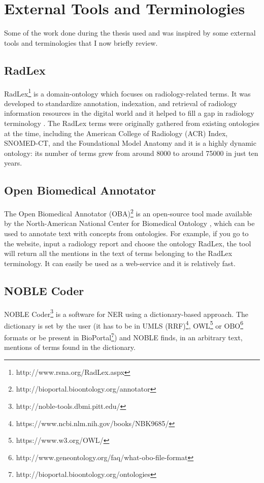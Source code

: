 \section{External Tools and Terminologies}

Some of the work done during the thesis used and was inspired by some external tools and terminologies that I now briefly review.

\subsection{RadLex}

RadLex\footnote{http://www.rsna.org/RadLex.aspx} is a domain-ontology which focuses on radiology-related terms. It was developed to standardize annotation, indexation, and retrieval of radiology information resources in the digital world \citep{Langlotz2006} and it helped to fill a gap in radiology terminology \citep{Langlotz2002, Woods2013}. The RadLex terms were originally gathered from existing ontologies at the time, including the American College of Radiology (ACR) Index, SNOMED-CT, and the Foundational Model Anatomy and it is a highly dynamic ontology: its number of terms grew from around 8000 to around 75000 in just ten years. 

\subsection{Open Biomedical Annotator}

The Open Biomedical Annotator (OBA)\footnote{http://bioportal.bioontology.org/annotator} is an open-source tool made available by the North-American National Center for Biomedical Ontology \citep{Jonquet2009}, which can be used to annotate text with concepts from ontologies. For example, if you go to the website, input a radiology report and choose the ontology RadLex, the tool will return all the mentions in the text of terms belonging to the RadLex terminology. It can easily be used as a web-service and it is relatively fast. 

\subsection{NOBLE Coder}

NOBLE Coder\footnote{http://noble-tools.dbmi.pitt.edu/} \citep{Tseytlin2016} is a software for NER using a dictionary-based approach. The dictionary is set by the user (it  has to be in UMLS (RRF)\footnote{https://www.ncbi.nlm.nih.gov/books/NBK9685/}, OWL\footnote{https://www.w3.org/OWL/} or OBO\footnote{http://www.geneontology.org/faq/what-obo-file-format} formats or be present in BioPortal\footnote{http://bioportal.bioontology.org/ontologies}) and NOBLE finds, in an arbitrary text, mentions of terms found in the dictionary.

